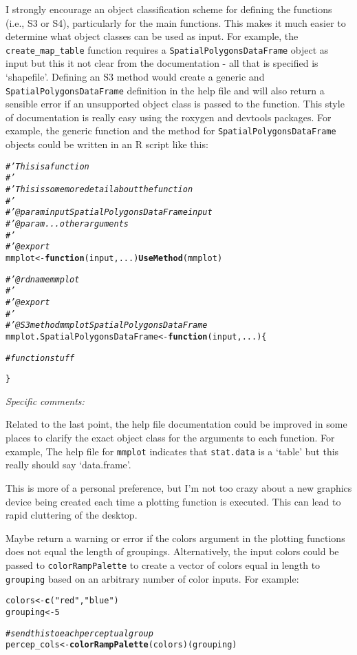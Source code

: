 \documentclass[letterpaper,12pt]{article}\usepackage[]{graphicx}\usepackage[]{color}
\makeatletter
\newcommand{\hlnum}[1]{\textcolor[rgb]{0.686,0.059,0.569}{#1}}%
\newcommand{\hlstr}[1]{\textcolor[rgb]{0.192,0.494,0.8}{#1}}%
\newcommand{\hlcom}[1]{\textcolor[rgb]{0.678,0.584,0.686}{\textit{#1}}}%
\newcommand{\hlstd}[1]{\textcolor[rgb]{0.345,0.345,0.345}{#1}}%
\newcommand{\hlkwa}[1]{\textcolor[rgb]{0.161,0.373,0.58}{\textbf{#1}}}%
\newcommand{\hlkwb}[1]{\textcolor[rgb]{0.69,0.353,0.396}{#1}}%
\newcommand{\hlkwc}[1]{\textcolor[rgb]{0.333,0.667,0.333}{#1}}%
\newcommand{\hlkwd}[1]{\textcolor[rgb]{0.737,0.353,0.396}{\textbf{#1}}}%
\newenvironment{kframe}{%
 \def\at@end@of@kframe{}%
 \ifinner\ifhmode%
  \def\at@end@of@kframe{\end{minipage}}%
  \begin{minipage}{\columnwidth}%
 \fi\fi%
 \def\FrameCommand##1{\hskip\@totalleftmargin \hskip-\fboxsep
 \colorbox{shadecolor}{##1}\hskip-\fboxsep
     \hskip-\linewidth \hskip-\@totalleftmargin \hskip\columnwidth}%
 \MakeFramed {\advance\hsize-\width
   \@totalleftmargin\z@ \linewidth\hsize
   \@setminipage}}%
 {\par\unskip\endMakeFramed%
 \at@end@of@kframe}
\makeatother
\begin{document}
I strongly encourage an object classification scheme for defining the functions (i.e., S3 or S4), particularly for the main functions.  This makes it much easier to determine what object classes can be used as input.  For example, the \texttt{create\_map\_table} function requires a \texttt{SpatialPolygonsDataFrame} object as input but this it not clear from the documentation - all that is specified is `shapefile'. Defining an S3 method would create a generic and \texttt{SpatialPolygonsDataFrame} definition in the help file and will also return a sensible error if an unsupported object class is passed to the function.  This style of documentation is really easy using the roxygen and devtools packages.  For example, the generic function and the method for \texttt{SpatialPolygonsDataFrame} objects could be written in an R script like this:
\begin{kframe}
\begin{alltt}
\hlcom{#' This is a function}
\hlcom{#'}
\hlcom{#' This is some more detail about the function}
\hlcom{#'}
\hlcom{#' @param input SpatialPolygonsDataFrame input}
\hlcom{#' @param ... other arguments}
\hlcom{#' }
\hlcom{#' @export}
\hlstd{mmplot} \hlkwb{<-} \hlkwa{function}\hlstd{(}\hlkwc{input}\hlstd{,} \hlkwc{...}\hlstd{)} \hlkwd{UseMethod}\hlstd{(mmplot)}

\hlcom{#' @rdname mmplot}
\hlcom{#'}
\hlcom{#' @export}
\hlcom{#'}
\hlcom{#' @S3method mmplot SpatialPolygonsDataFrame}
\hlstd{mmplot.SpatialPolygonsDataFrame} \hlkwb{<-} \hlkwa{function}\hlstd{(}\hlkwc{input}\hlstd{,} \hlkwc{...}\hlstd{)\{}

  \hlcom{# function stuff}

\hlstd{\}}
\end{alltt}
\end{kframe}

{\it Specific comments:}

Related to the last point, the help file documentation could be improved in some places to clarify the exact object class for the arguments to each function.  For example, The help file for \texttt{mmplot} indicates that \texttt{stat.data} is a `table' but this really should say `data.frame'.

This is more of a personal preference, but I'm not too crazy about a new graphics device being created each time a plotting function is executed.  This can lead to rapid cluttering of the desktop.

Maybe return a warning or error if the colors argument in the plotting functions does not equal the length of groupings.  Alternatively, the input colors could be passed to \texttt{colorRampPalette} to create a vector of colors equal in length to \texttt{grouping} based on an arbitrary number of color inputs.  For example:
\begin{kframe}
\begin{alltt}
\hlstd{colors} \hlkwb{<-} \hlkwd{c}\hlstd{(}\hlstr{"red"}\hlstd{,} \hlstr{"blue"}\hlstd{)}
\hlstd{grouping} \hlkwb{<-} \hlnum{5}

\hlcom{# send this to each perceptual group}
\hlstd{percep_cols} \hlkwb{<-} \hlkwd{colorRampPalette}\hlstd{(colors)(grouping)}
\end{alltt}
\end{kframe}
\end{document}
